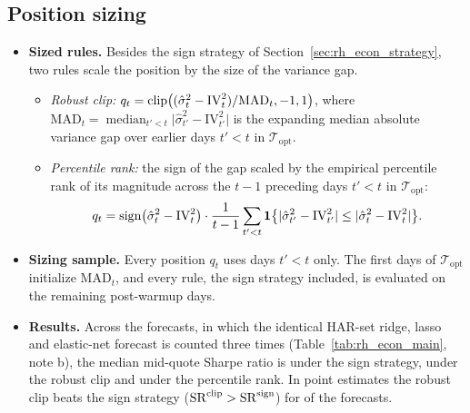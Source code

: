 \subsection{Position sizing}
\label{app:rh_econ_sizing}
\begin{itemize}
\item \textbf{Sized rules.} Besides the sign strategy of Section~\ref{sec:rh_econ_strategy}, two rules scale the
  position by the size of the variance gap.
  \begin{itemize}
  \item \emph{Robust clip:} $q_t = \operatorname{clip}\bigl((\hat\sigma^2_t - \mathrm{IV}_t^2)/\mathrm{MAD}_t, -1, 1\bigr)$, where
    $\mathrm{MAD}_t = \operatorname{median}_{t'<t}\bigl|\hat\sigma^2_{t'} - \mathrm{IV}_{t'}^2\bigr|$ is the expanding
    median absolute variance gap over earlier days $t' < t$ in $\mathcal T_{\mathrm{opt}}$.
  \item \emph{Percentile rank:} the sign of the gap scaled by the empirical percentile rank of its magnitude across
    the $t - 1$ preceding days $t' < t$ in $\mathcal T_{\mathrm{opt}}$:
    \[
      q_t = \operatorname{sign}\bigl(\hat\sigma^2_t - \mathrm{IV}_t^2\bigr)\cdot\frac{1}{t-1}\sum_{t'<t}
        \mathbf{1}\bigl\{|\hat\sigma^2_{t'} - \mathrm{IV}_{t'}^2| \le |\hat\sigma^2_t - \mathrm{IV}_t^2|\bigr\}.
    \]
  \end{itemize}
\item \textbf{Sizing sample.} Every position $q_t$ uses days $t' < t$ only. The first \rheSzWarmup{} days of
  $\mathcal T_{\mathrm{opt}}$ initialize $\mathrm{MAD}_t$, and every rule, the sign strategy included, is evaluated
  on the remaining \rheSzDays{} post-warmup days.
\item \textbf{Results.} Across the \rhrPoolN{} forecasts, in which the identical HAR-set ridge, lasso and
  elastic-net forecast is counted three times (Table~\ref{tab:rh_econ_main}, note b), the median mid-quote Sharpe
  ratio is \rhrPoolSzSignMed{} under the sign strategy, \rhrPoolSzClipMed{} under the robust clip and
  \rhrPoolSzRankMed{} under the percentile rank. In point estimates the robust clip beats the sign strategy
  ($\mathrm{SR}^{\mathrm{clip}} > \mathrm{SR}^{\mathrm{sign}}$) for \rhrPoolSzClipBeats{} of the \rhrPoolN{} forecasts.
\end{itemize}


